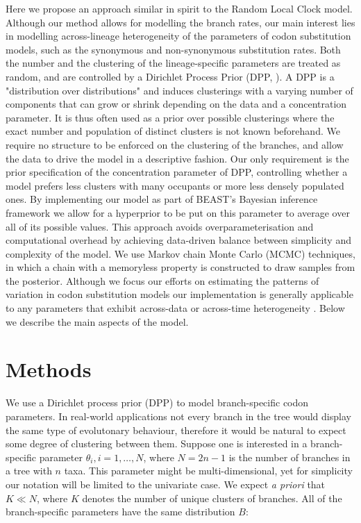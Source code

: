 Here we propose an approach similar in spirit to the Random Local Clock model.
Although our method allows for modelling the branch rates, our main interest lies in modelling across-lineage heterogeneity of the parameters of codon substitution models, such as the synonymous and non-synonymous substitution rates.
Both the number and the clustering of the lineage-specific parameters are treated as random, and are controlled by a Dirichlet Process Prior (DPP, \citet{Ferguson1973}).
A DPP is a "distribution over distributions" and induces clusterings with a varying number of components that can grow or shrink depending on the data and a concentration parameter.
It is thus often used as a prior over possible clusterings where the exact number and population of distinct clusters is not known beforehand.
We require no structure to be enforced on the clustering of the branches, and allow the data to drive the model in a descriptive fashion. 
Our only requirement is the prior specification of the concentration parameter of DPP, controlling whether a model prefers less clusters with many occupants or more less densely populated ones. 
By implementing our model as part of BEAST's Bayesian inference framework we allow for a hyperprior to be put on this parameter to average over all of its possible values. 
This approach avoids overparameterisation and computational overhead by achieving data-driven balance between simplicity and complexity of the model.
We use Markov chain Monte Carlo (MCMC) techniques, in which a chain with a memoryless property is constructed to draw samples from the posterior.
Although we focus our efforts on estimating the patterns of variation in codon substitution models our implementation is generally applicable to any parameters that exhibit across-data or across-time heterogeneity .
Below we describe the main aspects of the model.


\section{Methods}

We use a Dirichlet process prior (DPP) to model branch-specific codon parameters.
In real-world applications not every branch in the tree would display the same type of evolutonary behaviour, therefore it would be natural to expect some degree of clustering between them.
Suppose one is interested in a branch-specific parameter $\theta_{i}, i=1,\ldots,N$, where $N=2n-1$ is the number of branches in a tree with $n$ taxa. 
This parameter might be multi-dimensional, yet for simplicity our notation will be limited to the univariate case.
We expect \emph{a priori} that $K\ll N$, where $K$ denotes the number of unique clusters of branches.
All of the branch-specific parameters have the same distribution $B$:

